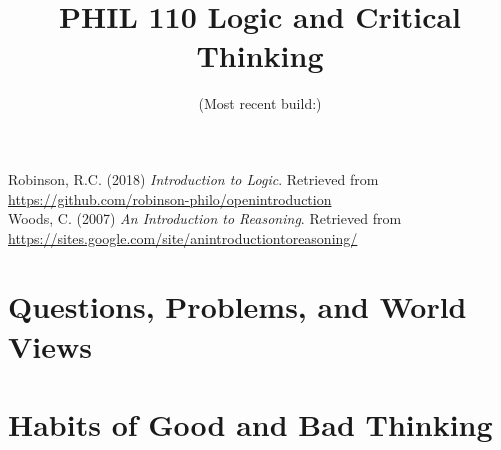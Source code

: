 \documentclass[twoside, openright]{book}
\begin{document}
Robinson, R.C. (2018) \emph{Introduction to Logic}. Retrieved from \\
\url{https://github.com/robinson-philo/openintroduction} \\

Woods, C. (2007) \emph{An Introduction to Reasoning}. Retrieved from \\
\url{https://sites.google.com/site/anintroductiontoreasoning/} \\

\newpage

\title{\bf PHIL 110 Logic and Critical Thinking}
\author{(Most recent build:)}
\maketitle

\setcounter{tocdepth}{4}
\tableofcontents

\chapter{Questions, Problems, and World Views}


\chapter{Habits of Good and Bad Thinking}
   
%








\end{document}
